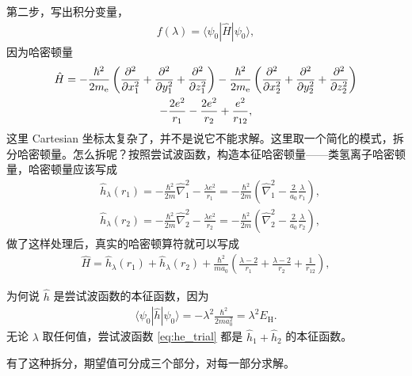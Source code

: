 第二步，写出积分变量，
\begin{align}
    f(\lambda) = \langle \psi_0 | \hat H | \psi_0 \rangle,
\end{align}
因为哈密顿量
\begin{multline}
    \hat H 
    = -\frac{\hbar^2}{2m_\mathrm{e}} \left(\pdv[2]{x_1} + \pdv[2]{y_1} + \pdv[2]{z_1}\right) 
    - \frac{\hbar^2}{2m_\mathrm{e}} \left(\pdv[2]{x_2} + \pdv[2]{y_2} + \pdv[2]{z_2}\right) \\
    - \frac{2e^2}{r_1} - \frac{2e^2}{r_2} + \frac{e^2}{r_{12}},
\end{multline}
这里 Cartesian 坐标太复杂了，并不是说它不能求解。这里取一个简化的模式，拆分哈密顿量。怎么拆呢？按照尝试波函数，构造本征哈密顿量——类氢离子哈密顿量，哈密顿量应该写成
\begin{align}
    &\hat h_\lambda (r_1) = -\frac{\hbar^2}{2m} \hat\nabla_1^2 - \frac{\lambda e^2}{r_1} = -\frac{\hbar^2}{2m} \left(\hat\nabla_1^2 - \frac{2}{a_0}\frac{\lambda}{r_1}\right), \\
    &\hat h_{\lambda}(r_2) = -\frac{\hbar^2}{2m} \hat\nabla_2^2 - \frac{\lambda e^2}{r_2} = -\frac{\hbar^2}{2m} \left(\hat\nabla_2^2 - \frac{2}{a_0}\frac{\lambda}{r_2}\right), 
\end{align}
做了这样处理后，真实的哈密顿算符就可以写成
\begin{align}
    \hat H = \hat h_\lambda (r_1) + \hat h_\lambda (r_2)
    + \frac{\hbar^2}{ma_0} 
    \left(
        \frac{\lambda-2}{r_1} + 
        \frac{\lambda-2}{r_2} + 
        \frac1{r_{12}}
    \right),
\end{align}

为何说 $\hat h$ 是尝试波函数的本征函数，因为
\begin{align}
    \langle \psi_0 | \hat h | \psi_0 \rangle = - \lambda^2 \frac{\hbar^2}{2m a_0^2} = \lambda^2 E_{\text{H}}. 
\end{align}
无论 $\lambda$ 取任何值，尝试波函数 \eqref{eq:he_trial}
都是 $\hat h_1 + \hat h_2$ 的本征函数。

有了这种拆分，期望值可分成三个部分，对每一部分求解。

